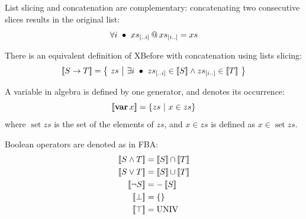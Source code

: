 \documentclass[12pt,openright,twoside,a4paper,oldfontcommands,english,brazil,final]{abntex2}
\makeatletter
\theoremstyle{theo}
\newcommand{\sliceright}[2]{\ensuremath #1_{\left[..#2\right]}}
\newcommand{\sliceleft}[2]{\ensuremath #1_{\left[#2..\right]}}
\def\varop{\ensuremath\operatorname{\mathbf{var}}}
\newcommand{\var}[1]{\ensuremath\varop #1}
\def\xbeforeop{\ensuremath\rightarrow}
\newcommand{\xbefore}[2]{\ensuremath #1 \xbeforeop #2 }
\def\True{\ensuremath\operatorname{UNIV}}
\def\False{\ensuremath\operatorname{\left\{\right\}}}
\newcommand{\append}[2]{\ensuremath #1 \operatorname{\mathbf{@}} #2}
\def\union{\ensuremath\operatorname{\cup}}
\def\inter{\ensuremath\operatorname{\cap}}
\newcommand{\denote}[1]{\ensuremath\left[\!\left[#1\right]\!\right]}
\makeatother
\begin{document}
List slicing and concatenation are complementary: concatenating two consecutive slices results in the original list:
\begin{equation}
\label{law:slice-append}
\forall i ~\bullet~ \append{\sliceright{xs}{i}}{\sliceleft{xs}{i}} = xs
\end{equation}

There is an equivalent definition of \ac{XBefore} with concatenation using lists slicing:
%
\begin{equation}
\label{def:xbefore-slice}
\denote{\xbefore{S}{T}} =
  \left\{~
    zs ~\middle|~ \exists i ~\bullet~ \sliceright{zs}{i} \in \denote{S} \land \sliceleft{zs}{i} \in \denote{T}
  ~\right\}
\end{equation}

A variable in \ac{algebra} is defined by one generator, and denotes its occurrence:
%
\begin{equation}
\label{def:var}
\denote{\var{x}} =
  \left\{
    zs ~\middle|~ x \in zs
  \right\}
\end{equation}
%
where $\mathop{set}zs$ is the set of the elements of $zs$, and $x \in zs$ is defined as $x \in \mathop{set} zs$.

Boolean operators are denoted as in \ac{FBA}:
\begin{subequations}
\begin{align}
\denote{S \land T} & = \denote{S} \inter \denote{T}\\
\denote{S \lor T} & = \denote{S} \union \denote{T}\\
\denote{\lnot S} & = - \denote{S}\\
\denote{\bot} &= \False\\
\denote{\top} &= \True
\end{align}
\end{subequations}
\end{document}
